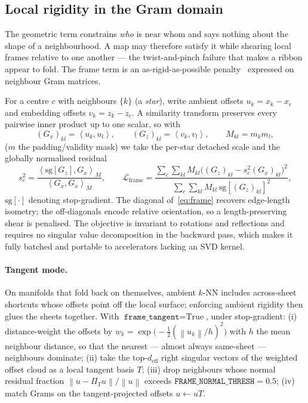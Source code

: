 \documentclass[12pt]{iopart}
\theoremstyle{definition}
\theoremstyle{plain}
\theoremstyle{remark}
\newcommand{\norm}[1]{\left\lVert#1\right\rVert}
\newcommand{\inner}[2]{\left\langle #1,#2\right\rangle}
\newcommand{\loss}{\mathcal{L}}
\newcommand{\code}[1]{\texttt{#1}}
\begin{document}
\subsection{Local rigidity in the Gram domain}
\label{sec:frame}

The geometric term constrains \emph{who} is near whom and says nothing about
the shape of a neighbourhood. A map may therefore satisfy it while shearing
local frames relative to one another --- the twist-and-pinch failure that makes
a ribbon appear to fold. The frame term is an as-rigid-as-possible
penalty~\cite{sorkine2007arap} expressed on neighbour Gram matrices.

For a centre $c$ with neighbours $\{k\}$ (a \emph{star}), write ambient offsets
$u_k=x_k-x_c$ and embedding offsets $v_k=z_k-z_c$. A similarity transform
preserves every pairwise inner product up to one scalar, so with
\begin{equation}
\label{eq:grams}
(G_x)_{kl}=\inner{u_k}{u_l},
\qquad
(G_z)_{kl}=\inner{v_k}{v_l},
\qquad
M_{kl}=m_k m_l,
\end{equation}
($m$ the padding/validity mask) we take the per-star detached scale and the
globally normalised residual
\begin{equation}
\label{eq:frame}
s_c^2
=
\frac{\inner{\mathrm{sg}[G_z]}{G_x}_{M}}{\inner{G_x}{G_x}_{M}},
\qquad
\loss_{\mathrm{frame}}
=
\frac{\sum_c\sum_{kl}M_{kl}\bigl((G_z)_{kl}-s_c^2 (G_x)_{kl}\bigr)^2}
     {\sum_c\sum_{kl}M_{kl}\,\mathrm{sg}[(G_z)_{kl}]^2},
\end{equation}
$\mathrm{sg}[\cdot]$ denoting stop-gradient. The diagonal of~\eqref{eq:frame}
recovers edge-length isometry; the off-diagonals encode relative orientation,
so a length-preserving shear is penalised. The objective is invariant to
rotations and reflections and requires no singular value decomposition in the
backward pass, which makes it fully batched and portable to accelerators
lacking an SVD kernel.

\paragraph{Tangent mode.}
On manifolds that fold back on themselves, ambient $k$-NN includes across-sheet
shortcuts whose offsets point off the local surface; enforcing ambient rigidity
then glues the sheets together. With $\code{frame\_tangent}=\text{True}$, under
stop-gradient: (i) distance-weight the offsets by
$w_k=\exp\bigl(-\tfrac12(\norm{u_k}/h)^2\bigr)$ with $h$ the mean neighbour
distance, so that the nearest --- almost always same-sheet --- neighbours
dominate; (ii) take the top-$d_{\mathrm{eff}}$ right singular vectors of the
weighted offset cloud as a local tangent basis $T$; (iii) drop neighbours whose
normal residual fraction $\norm{u-\Pi_T u}/\norm{u}$ exceeds
$\code{FRAME\_NORMAL\_THRESH}=0.5$; (iv) match Grams on the tangent-projected
offsets $u\leftarrow uT$.
\end{document}
